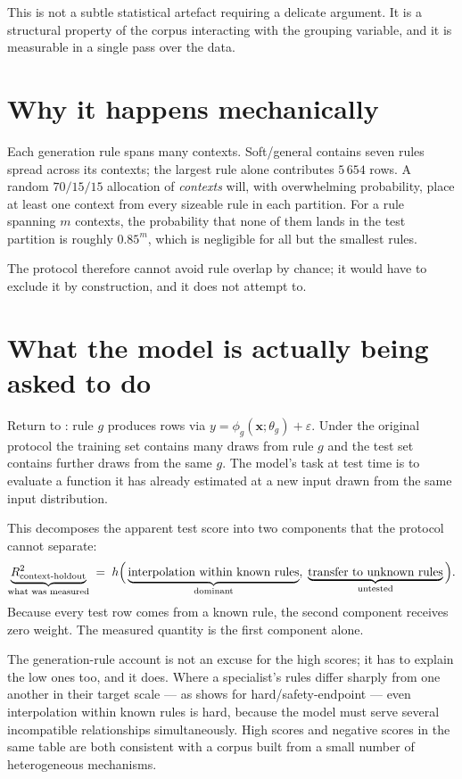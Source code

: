 This is not a subtle statistical artefact requiring a delicate argument.
It is a structural property of the corpus interacting with the grouping
variable, and it is measurable in a single pass over the data.

\section{Why it happens mechanically}

Each generation rule spans many contexts. Soft/general contains seven
rules spread across its contexts; the largest rule alone contributes
$5\,654$ rows. A random $70/15/15$ allocation of \emph{contexts} will,
with overwhelming probability, place at least one context from every
sizeable rule in each partition. For a rule spanning $m$ contexts, the
probability that none of them lands in the test partition is roughly
$0.85^{m}$, which is negligible for all but the smallest rules.

The protocol therefore cannot avoid rule overlap by chance; it would have
to exclude it by construction, and it does not attempt to.

\section{What the model is actually being asked to do}

Return to : rule $g$ produces rows via
$y = \phi_g(\mathbf{x};\theta_g) + \varepsilon$. Under the original
protocol the training set contains many draws from rule $g$ and the test
set contains further draws from the same $g$. The model's task at test time
is to evaluate a function it has already estimated at a new input drawn
from the same input distribution.

This decomposes the apparent test score into two components that the
protocol cannot separate:
\begin{equation}
\underbrace{R^2_{\text{context-holdout}}}_{\text{what was measured}}
\;=\;
h\Big(
\underbrace{\text{interpolation within known rules}}_{\text{dominant}},
\;
\underbrace{\text{transfer to unknown rules}}_{\text{untested}}
\Big).
\end{equation}
Because every test row comes from a known rule, the second component
receives zero weight. The measured quantity is the first component alone.

\begin{findingbox}[title=Why this also explains the negative results]
The generation-rule account is not an excuse for the high scores; it has
to explain the low ones too, and it does. Where a specialist's rules
differ sharply from one another in their target scale --- as
 shows for hard/safety-endpoint --- even interpolation
within known rules is hard, because the model must serve several
incompatible relationships simultaneously. High scores and negative scores
in the same table are both consistent with a corpus built from a small
number of heterogeneous mechanisms.
\end{findingbox}

